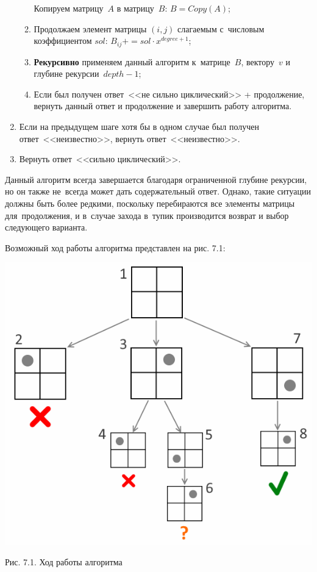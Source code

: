 \begin{enumerate}
\begin{enumerate}
                Копируем матрицу~$A$ в матрицу~$B$: $B = Copy(A)$;
            \item
                Продолжаем элемент матрицы $(i, j)$ слагаемым с~числовым коэффициентом $sol$:
                $B_{ij} \mathrel{{+}{=}} sol \cdot x^{degree + 1}$;
            \item
                \textbf{Рекурсивно} применяем данный алгоритм
                к~матрице~$B$, вектору~$v$ и глубине рекурсии~$depth - 1$;
            \item
                Если был получен ответ~<<не сильно циклический>> + продолжение, вернуть данный ответ и продолжение
                и завершить работу алгоритма.
        \end{enumerate}
    \item
        Если на предыдущем шаге хотя бы в одном случае был получен ответ~<<неизвестно>>, вернуть ответ~<<неизвестно>>.
    \item
        Вернуть ответ~<<сильно циклический>>.
\end{enumerate}

Данный алгоритм всегда завершается благодаря ограниченной глубине рекурсии,
но он также не~всегда может дать содержательный ответ.
Однако, такие ситуации должны быть более редкими, поскольку перебираются все элементы матрицы для~продолжения,
и в~случае захода в~тупик производится возврат и выбор следующего варианта.
\medskip

Возможный ход работы алгоритма представлен на рис. 7.1:

\begin{center}
    \includegraphics[scale=0.6]{pictures/recursion.png}

    \small
    Рис. 7.1. Ход работы алгоритма
\end{center}

